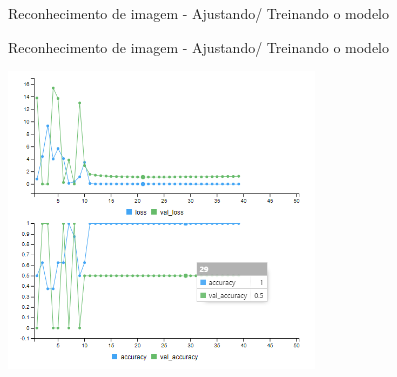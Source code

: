\documentclass[
  ignorenonframetext,
]{beamer}
\newenvironment{Shaded}{\begin{snugshade}}{\end{snugshade}}
\newcommand{\DataTypeTok}[1]{\textcolor[rgb]{0.13,0.29,0.53}{#1}}
\newcommand{\DecValTok}[1]{\textcolor[rgb]{0.00,0.00,0.81}{#1}}
\newcommand{\FloatTok}[1]{\textcolor[rgb]{0.00,0.00,0.81}{#1}}
\newcommand{\KeywordTok}[1]{\textcolor[rgb]{0.13,0.29,0.53}{\textbf{#1}}}
\newcommand{\NormalTok}[1]{#1}
\newcommand{\OperatorTok}[1]{\textcolor[rgb]{0.81,0.36,0.00}{\textbf{#1}}}
\newcommand{\StringTok}[1]{\textcolor[rgb]{0.31,0.60,0.02}{#1}}
\begin{document}
\begin{frame}[fragile]{Reconhecimento de imagem - Ajustando/ Treinando o
modelo}
\protect\hypertarget{reconhecimento-de-imagem---ajustando-treinando-o-modelo}{}

\begin{Shaded}
\end{Shaded}

\end{frame}

\begin{frame}{Reconhecimento de imagem - Ajustando/ Treinando o modelo}
\protect\hypertarget{reconhecimento-de-imagem---ajustando-treinando-o-modelo-1}{}

\includegraphics[width=3.2in]{IMAGENS/modelo_grafico}

\begin{center}
\tiny{}
\end{center}

\end{frame}
\end{document}
